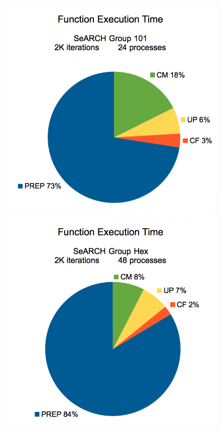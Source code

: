 \begin{figure}[!p]
	\begin{center}
		\includegraphics[width=\columnwidth]{report.may/images/load24101.png}
		\includegraphics[width=\columnwidth]{report.may/images/load48hex.png}

\end{center}
\end{figure}
